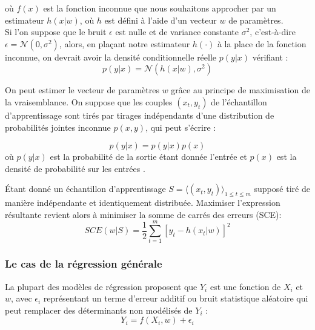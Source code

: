 		où $f(x)$ est la fonction inconnue que nous souhaitons approcher par un estimateur $h(x|w)$, où $h$ est défini à l'aide d'un vecteur $w$ de paramètres\cite{alpaydin2010introduction}.\\
		Si l'on suppose que le bruit $\epsilon$ est nulle et de variance constante $\sigma^2$, c'est-à-dire $ \epsilon = \mathcal{N}(0,\sigma^2)$, alors, en plaçant notre estimateur $h(\cdot)$ à la place de la fonction inconnue, on devrait avoir la densité conditionnelle réelle $p(y|x)$ vérifiant :
		\begin{equation}
			p(y|x) = \mathcal{N}(h(x|w),\sigma^2)
		\end{equation}
		
		On peut estimer le vecteur de paramètres $w$ grâce au principe de maximisation de la vraisemblance. On suppose que les couples $(x_t, y_t)$ de l'échantillon d'apprentissage sont tirés par tirages indépendants d'une distribution de probabilités jointes inconnue $p(x, y)$, qui peut s'écrire :
		
		$$
			p(y|x) = p(y|x)p(x)
		$$
		où $p(y|x)$ est la probabilité de la sortie étant donnée l'entrée et $p(x)$ est la densité de probabilité sur les entrées \cite{matloff2017statistical}.
		
		Étant donné un échantillon d'apprentissage $S = \langle (x_t,y_t) \rangle_{1\leq t\leq m} $ supposé tiré de manière indépendante et identiquement distribuée.
		Maximiser l'expression résultante revient alors à minimiser la somme de carrés des erreurs (SCE):
		\begin{equation}\label{eq:sce_1}
			SCE(w|\mathit{S}) = \frac{1}{2} \sum_{{t=1}}^{m}{ [ y_t - h(x_t|w) ]^2}	
		\end{equation}
		
	\subsubsection{Le cas de la régression générale}
		La plupart des modèles de régression proposent que $Y_{i}$ est une fonction de $X_{i}$ et $w$, avec $\epsilon_{i}$ représentant un terme d'erreur additif ou bruit statistique aléatoire qui peut remplacer des déterminants non modélisés de $Y_{i}$ :
		\begin{equation}
			{\displaystyle Y_{i}=f(X_{i},w )+\epsilon_{i}}
		\end{equation}
	
